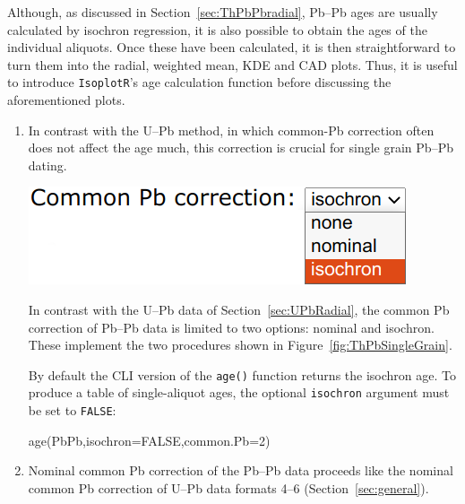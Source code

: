 \begin{refsection}
Although, as discussed in Section~\ref{sec:ThPbPbradial}, Pb--Pb ages
are usually calculated by isochron regression, it is also possible to
obtain the ages of the individual aliquots. Once these have been
calculated, it is then straightforward to turn them into the radial,
weighted mean, KDE and CAD plots. Thus, it is useful to introduce
\texttt{IsoplotR}'s age calculation function before discussing the
aforementioned plots.

\begin{enumerate}

\item In contrast with the U--Pb method, in which common-Pb correction
  often does not affect the age much, this correction is crucial for
  single grain Pb--Pb dating.
  
\noindent\begin{minipage}[t]{.35\linewidth}
\strut\vspace*{-\baselineskip}\newline
\includegraphics[width=\linewidth]{../figures/PbPbRadialPb0.png}
\end{minipage}
\begin{minipage}[t]{.65\linewidth}
  In contrast with the U--Pb data of Section~\ref{sec:UPbRadial}, the
  common Pb correction of Pb--Pb data is limited to two options:
  nominal and isochron. These implement the two procedures shown in
  Figure~\ref{fig:ThPbSingleGrain}.
\end{minipage}

By default the CLI version of the \texttt{age()} function returns the
isochron age. To produce a table of single-aliquot ages, the optional
\texttt{isochron} argument must be set to \texttt{FALSE}:

\begin{console}
age(PbPb,isochron=FALSE,common.Pb=2)
\end{console}

\item Nominal common Pb correction of the Pb--Pb data proceeds like
  the nominal common Pb correction of U--Pb data formats 4--6
  (Section~\ref{sec:general}).


\end{enumerate}
\end{refsection}
